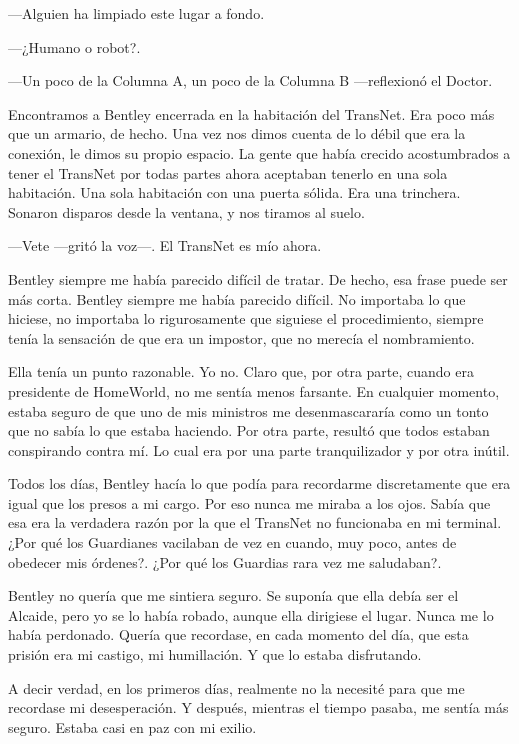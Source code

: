 ---Alguien ha limpiado este lugar a fondo.

---¿Humano o robot?.

---Un poco de la Columna A, un poco de la Columna B ---reflexionó el
Doctor.

Encontramos a Bentley encerrada en la habitación del TransNet. Era poco
más que un armario, de hecho. Una vez nos dimos cuenta de lo débil que
era la conexión, le dimos su propio espacio. La gente que había crecido
acostumbrados a tener el TransNet por todas partes ahora aceptaban
tenerlo en una sola habitación. Una sola habitación con una puerta
sólida. Era una trinchera. Sonaron disparos desde la ventana, y nos
tiramos al suelo.

---Vete ---gritó la voz---. El TransNet es mío ahora.

Bentley siempre me había parecido difícil de tratar. De hecho, esa frase
puede ser más corta. Bentley siempre me había parecido difícil. No
importaba lo que hiciese, no importaba lo rigurosamente que siguiese el
procedimiento, siempre tenía la sensación de que era un impostor, que no
merecía el nombramiento.

Ella tenía un punto razonable. Yo no. Claro que, por otra parte, cuando
era presidente de HomeWorld, no me sentía menos farsante. En cualquier
momento, estaba seguro de que uno de mis ministros me desenmascararía
como un tonto que no sabía lo que estaba haciendo. Por otra parte,
resultó que todos estaban conspirando contra mí. Lo cual era por una
parte tranquilizador y por otra inútil.

Todos los días, Bentley hacía lo que podía para recordarme discretamente
que era igual que los presos a mi cargo. Por eso nunca me miraba a los
ojos. Sabía que esa era la verdadera razón por la que el TransNet no
funcionaba en mi terminal. ¿Por qué los Guardianes vacilaban de vez en
cuando, muy poco, antes de obedecer mis órdenes?. ¿Por qué los Guardias
rara vez me saludaban?.

Bentley no quería que me sintiera seguro. Se suponía que ella debía ser
el Alcaide, pero yo se lo había robado, aunque ella dirigiese el lugar.
Nunca me lo había perdonado. Quería que recordase, en cada momento del
día, que esta prisión era mi castigo, mi humillación. Y que lo estaba
disfrutando.

A decir verdad, en los primeros días, realmente no la necesité para que
me recordase mi desesperación. Y después, mientras el tiempo pasaba, me
sentía más seguro. Estaba casi en paz con mi exilio.

